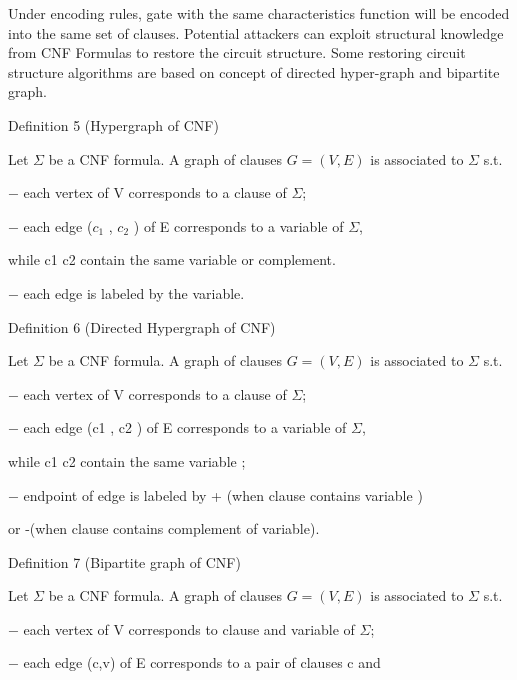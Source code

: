 \documentclass[runningheads,a4paper]{llncs}
\begin{document}
Under encoding rules, gate with the same characteristics function will be encoded into the same set of clauses. Potential attackers can exploit structural knowledge from CNF Formulas to restore the circuit structure. Some restoring circuit structure algorithms are based on concept of directed hyper-graph and bipartite graph.	

\noindent \newline Definition 5 (Hypergraph of CNF)

\setlength{\parindent}{1em} Let $\Sigma$ be a CNF formula. A graph of clauses $G=(V,E)$ is associated to $\Sigma$ s.t.

\setlength{\parindent}{4em}  $-$ each vertex of V corresponds to a clause of  $\Sigma$;

\setlength{\parindent}{4em}  $-$ each edge ($c_1$ , $c_2$ ) of E corresponds to a variable of $\Sigma$, 

\setlength{\parindent}{5em} while c1 c2 contain the same variable or complement.

\setlength{\parindent}{4em}  $-$ each edge is labeled by the variable.
 
\noindent \newline Definition 6 (Directed Hypergraph of CNF)

\setlength{\parindent}{1em} Let $\Sigma$ be a CNF formula. A graph of clauses $G=(V,E)$ is associated to $\Sigma$ s.t.

\setlength{\parindent}{4em} $-$ each vertex of V corresponds to a clause of $\Sigma$;

\setlength{\parindent}{4em} $-$ each edge (c1 , c2 ) of E corresponds to a variable of $\Sigma$,

\setlength{\parindent}{5em} while c1 c2 contain the same variable ;

\setlength{\parindent}{4em} $-$ endpoint of edge is labeled by + (when clause contains variable ) 

\setlength{\parindent}{5em} or -(when clause contains complement of variable).

\noindent \newline Definition 7 (Bipartite graph of CNF)

\setlength{\parindent}{1em} Let $\Sigma$ be a CNF formula. A graph of clauses $G=(V,E)$ is associated to $\Sigma$ s.t.

\setlength{\parindent}{4em} $-$ each vertex of V corresponds to clause and variable of $\Sigma$;

\setlength{\parindent}{4em} $-$ each edge (c,v) of E corresponds to a pair of clauses c and
\end{document}
